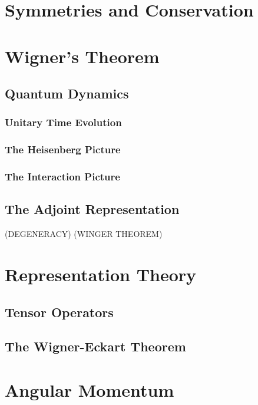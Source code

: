 \documentclass[12pt]{extarticle}
\theoremstyle{definition}
\begin{document}
\section{Symmetries and Conservation}

\section{Wigner's Theorem}

\subsection{Quantum Dynamics}

\subsubsection{Unitary Time Evolution}

\subsubsection{The Heisenberg Picture}

\subsubsection{The Interaction Picture}

\subsection{The Adjoint Representation}

(DEGENERACY) (WINGER THEOREM)

\section{Representation Theory}

\subsection{Tensor Operators}

\subsection{The Wigner-Eckart Theorem}

\section{Angular Momentum}
\end{document}
